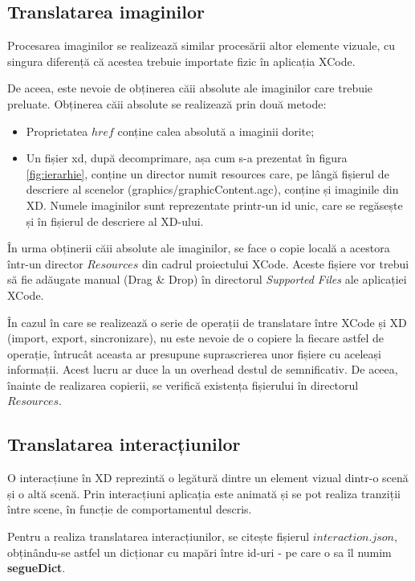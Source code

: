 \subsection{Translatarea imaginilor}

Procesarea imaginilor se realizează similar procesării altor elemente vizuale, cu singura diferență că acestea trebuie importate fizic în aplicația XCode.

De aceea, este nevoie de obținerea căii absolute ale imaginilor care trebuie preluate. 
Obținerea căii absolute se realizează prin două metode:

\begin{itemize}  
\item Proprietatea $href$ conține calea absolută a imaginii dorite;
\item Un fișier xd, după decomprimare, așa cum s-a prezentat în figura \ref{fig:ierarhie}, conține un director numit resources care, pe lângă fișierul de descriere al scenelor (graphics/graphicContent.agc), conține și imaginile din XD. Numele imaginilor sunt reprezentate printr-un id unic, care se regăsește și în fișierul de descriere al XD-ului.
\end{itemize}

În urma obținerii căii absolute ale imaginilor, se face o copie locală a acestora într-un director $Resources$ din cadrul proiectului XCode. Aceste fișiere vor trebui să fie adăugate manual (Drag \& Drop) în directorul \textit{Supported Files} ale aplicației XCode.

În cazul în care se realizează o serie de operații de translatare între XCode și XD (import, export, sincronizare), nu este nevoie de o copiere la fiecare astfel de operație, întrucât aceasta ar presupune suprascrierea unor fișiere cu aceleași informații. Acest lucru ar duce la un overhead destul de semnificativ. De aceea, înainte de realizarea copierii, se verifică existența fișierului în directorul $Resources$.

\subsection{Translatarea interacțiunilor}

O interacțiune în XD reprezintă o legătură dintre un element vizual dintr-o scenă și o altă scenă. Prin interacțiuni aplicația este animată și se pot realiza tranziții între scene, în funcție de comportamentul descris. 

Pentru a realiza translatarea interacțiunilor, se citește fișierul $interaction.json$, obținându-se astfel un dicționar cu mapări între id-uri - pe care o sa îl numim \textbf{segueDict}. 


